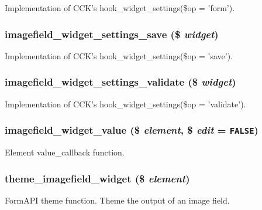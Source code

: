 Implementation of CCK's hook\_\-widget\_\-settings(\$op = 'form'). \hypertarget{imagefield__widget_8inc_6c7971999c540262989875a5dc50ec2c}{
\subsubsection[{imagefield\_\-widget\_\-settings\_\-save}]{\setlength{\rightskip}{0pt plus 5cm}imagefield\_\-widget\_\-settings\_\-save (\$ {\em widget})}}
\label{imagefield__widget_8inc_6c7971999c540262989875a5dc50ec2c}


Implementation of CCK's hook\_\-widget\_\-settings(\$op = 'save'). \hypertarget{imagefield__widget_8inc_ccae8d405d05c22db3fdbe3cdd8cd0de}{
\subsubsection[{imagefield\_\-widget\_\-settings\_\-validate}]{\setlength{\rightskip}{0pt plus 5cm}imagefield\_\-widget\_\-settings\_\-validate (\$ {\em widget})}}
\label{imagefield__widget_8inc_ccae8d405d05c22db3fdbe3cdd8cd0de}


Implementation of CCK's hook\_\-widget\_\-settings(\$op = 'validate'). \hypertarget{imagefield__widget_8inc_28634da6db6808b6b566de5e871bdd72}{
\subsubsection[{imagefield\_\-widget\_\-value}]{\setlength{\rightskip}{0pt plus 5cm}imagefield\_\-widget\_\-value (\$ {\em element}, \/  \$ {\em edit} = {\tt FALSE})}}
\label{imagefield__widget_8inc_28634da6db6808b6b566de5e871bdd72}


Element value\_\-callback function. \hypertarget{imagefield__widget_8inc_cc1ccabf552d770aa55ce34aab46b1aa}{
\subsubsection[{theme\_\-imagefield\_\-widget}]{\setlength{\rightskip}{0pt plus 5cm}theme\_\-imagefield\_\-widget (\$ {\em element})}}
\label{imagefield__widget_8inc_cc1ccabf552d770aa55ce34aab46b1aa}


FormAPI theme function. Theme the output of an image field. 
